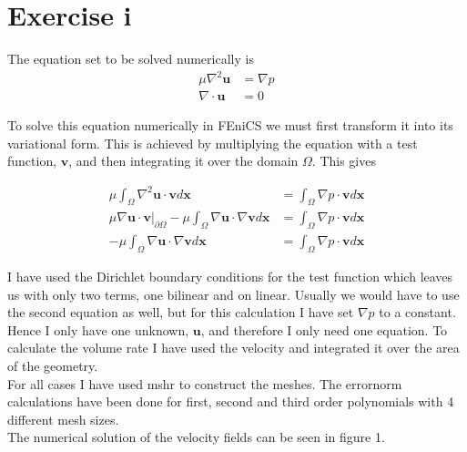 \documentclass[11pt]{report}
\begin{document}
\chapter*{Exercise i}
The equation set to be solved numerically is \begin{equation} \begin{split} \mu \nabla ^2\mathbf{u} &= \nabla p \\ \nabla \cdot \mathbf{u} &= 0 \end{split} \end{equation}

To solve this equation numerically in FEniCS we must first transform it into its variational form. This is achieved by multiplying the equation with a test function, $\mathbf{v}$, and then integrating it over the domain $\Omega$. This gives

\begin{equation}
\begin{split}
\mu \int _\Omega \nabla ^2 \mathbf{u} \cdot \mathbf{v} d\mathbf{x} & = \int _\Omega \nabla p \cdot \mathbf{v} d\mathbf{x} \\
\mu \nabla \mathbf{u}\cdot \mathbf{v} \Big |_{\partial \Omega} - \mu \int _\Omega \nabla \mathbf{u}\cdot \nabla \mathbf{v} d\mathbf{x} &= \int _\Omega \nabla p\cdot \mathbf{v}d\mathbf{x} \\
-\mu \int _\Omega \nabla \mathbf{u}\cdot \nabla \mathbf{v} d\mathbf{x} &= \int _\Omega \nabla p\cdot\mathbf{v}d\mathbf{x}
\end{split}
\end{equation}

I have used the Dirichlet boundary conditions for the test function which leaves us with only two terms, one bilinear and on linear. Usually we would have to use the second equation as well, but for this calculation I have set $\nabla p$ to a constant. Hence I only have one unknown, $\mathbf{u}$, and therefore I only need one equation. To calculate the volume rate I have used the velocity and integrated it over the area of the geometry.\\

For all cases I have used mshr to construct the meshes. The errornorm calculations have been done for first, second and third order polynomials with 4 different mesh sizes. \\

The numerical solution of the velocity fields can be seen in figure 1.
\end{document}
